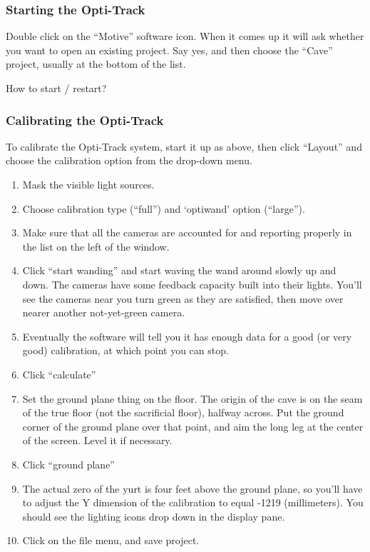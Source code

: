 \documentclass[11pt]{article}
\begin{document}
\subsubsection{Starting the Opti-Track}

Double click on the ``Motive'' software icon.  When it comes up it
will ask whether you want to open an existing project.  Say yes, and
then choose the ``Cave'' project, usually at the bottom of the list.


How to start / restart?

\subsubsection{Calibrating the Opti-Track}

To calibrate the Opti-Track system, start it up as above, then click
``Layout'' and choose the calibration option from the drop-down menu.

\begin{enumerate}

\item Mask the visible light sources.

\item Choose calibration type (``full'') and `optiwand' option
  (``large''). 

\item Make sure that all the cameras are accounted for and reporting
  properly in the list on the left of the window.

\item Click ``start wanding'' and start waving the wand around slowly
  up and down.  The cameras have some feedback capacity built into
  their lights.  You'll see the cameras near you turn green as they
  are satisfied, then move over nearer another not-yet-green camera.

\item Eventually the software will tell you it has enough data for a
  good (or very good) calibration, at which point you can stop.

\item Click ``calculate''

\item Set the ground plane thing on the floor.  The origin of the cave is on
  the seam of the true floor (not the sacrificial floor), halfway
  across.  Put the ground corner of the ground plane over that point,
  and aim the long leg at the center of the screen.  Level it if
  necessary.

\item Click ``ground plane''

\item The actual zero of the yurt is four feet above the ground plane,
  so you'll have to adjust the Y dimension of the calibration to equal
  -1219 (millimeters).  You should see the lighting icons drop down in
  the display pane.

\item Click on the file menu, and save project.

\end{enumerate}
\end{document}
